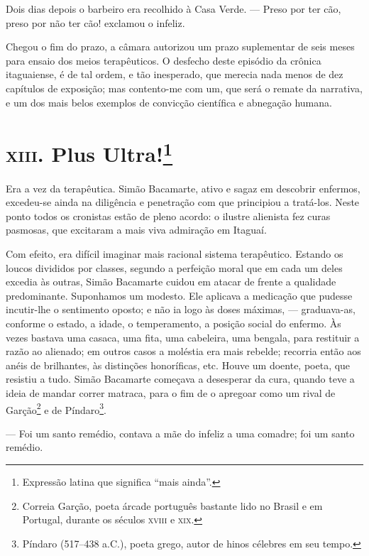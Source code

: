Dois dias depois o barbeiro era recolhido à Casa Verde. --- Preso por
ter cão, preso por não ter cão! exclamou o infeliz.

Chegou o fim do prazo, a câmara autorizou um prazo suplementar de seis
meses para ensaio dos meios terapêuticos. O desfecho deste episódio da
crônica itaguaiense, é de tal ordem, e tão inesperado, que merecia nada
menos de dez capítulos de exposição; mas contento-me com um, que será o
remate da narrativa, e um dos mais belos exemplos de convicção
científica e abnegação humana.

\section*{\textsc{xiii}. Plus Ultra!\protect\footnote[*]{\MakeUppercase{E}xpressão latina que significa ``mais ainda''.}}

Era a vez da terapêutica. Simão Bacamarte, ativo e sagaz em descobrir
enfermos, excedeu-se ainda na diligência e penetração com que principiou
a tratá-los. Neste ponto todos os cronistas estão de pleno acordo: o
ilustre alienista fez curas pasmosas, que excitaram a mais viva
admiração em Itaguaí.

Com efeito, era difícil imaginar mais racional sistema terapêutico.
Estando os loucos divididos por classes, segundo a perfeição moral que
em cada um deles excedia às outras, Simão Bacamarte cuidou em atacar de
frente a qualidade predominante. Suponhamos um modesto. Ele aplicava a
medicação que pudesse incutir-lhe o sentimento oposto; e não ia logo às
doses máximas, --- graduava-as, conforme o estado, a idade, o
temperamento, a posição social do enfermo. Às vezes bastava uma casaca,
uma fita, uma cabeleira, uma bengala, para restituir a razão ao
alienado; em outros casos a moléstia era mais rebelde; recorria então
aos anéis de brilhantes, às distinções honoríficas, etc. Houve um
doente, poeta, que resistiu a tudo. Simão Bacamarte começava a
desesperar da cura, quando teve a ideia de mandar correr matraca, para o
fim de o apregoar como um rival de Garção\footnote{Correia Garção, poeta
  árcade português bastante lido no Brasil e em Portugal, durante os
  séculos \textsc{xviii} e \textsc{xix}.} e de Píndaro\footnote{Píndaro (517--438 a.C.),
  poeta grego, autor de hinos célebres em seu tempo.}.

--- Foi um santo remédio, contava a mãe do infeliz a uma comadre; foi um
santo remédio.

